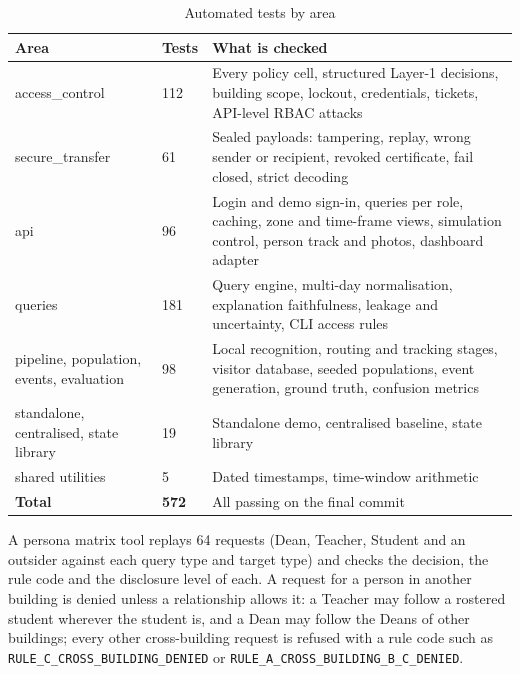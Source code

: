 \documentclass[12pt,a4paper,oneside]{report}
\begin{document}
\begin{table}[htbp]
\centering
\caption{Automated tests by area}\label{tab:tests}
{\small\setlength{\tabcolsep}{4pt}\renewcommand{\arraystretch}{1.2}
\begin{tabular}{|p{4.50cm}|p{1.37cm}|p{8.41cm}|}\hline
\textbf{Area} & \textbf{Tests} & \textbf{What is checked}\\\hline
access\_\allowbreak control & 112 & Every policy cell, structured Layer-1 decisions, building scope, lockout, credentials, tickets, API-level RBAC attacks\\\hline
secure\_\allowbreak transfer & 61 & Sealed payloads: tampering, replay, wrong sender or recipient, revoked certificate, fail closed, strict decoding\\\hline
api & 96 & Login and demo sign-in, queries per role, caching, zone and time-frame views, simulation control, person track and photos, dashboard adapter\\\hline
queries & 181 & Query engine, multi-day normalisation, explanation faithfulness, leakage and uncertainty, CLI access rules\\\hline
pipeline, population, events, evaluation & 98 & Local recognition, routing and tracking stages, visitor database, seeded populations, event generation, ground truth, confusion metrics\\\hline
standalone, centralised, state library & 19 & Standalone demo, centralised baseline, state library\\\hline
shared utilities & 5 & Dated timestamps, time-window arithmetic\\\hline
\textbf{Total} & \textbf{572} & All passing on the final commit\\\hline
\end{tabular}}
\end{table}

A persona matrix tool replays 64 requests (Dean, Teacher, Student and an outsider against each query type and target type) and checks the decision, the rule code and the disclosure level of each. A request for a person in another building is denied unless a relationship allows it: a Teacher may follow a rostered student wherever the student is, and a Dean may follow the Deans of other buildings; every other cross-building request is refused with a rule code such as \texttt{RULE\_\allowbreak C\_\allowbreak CROSS\_\allowbreak BUILDING\_\allowbreak DENIED} or \texttt{RULE\_\allowbreak A\_\allowbreak CROSS\_\allowbreak BUILDING\_\allowbreak B\_\allowbreak C\_\allowbreak DENIED}.
\end{document}
